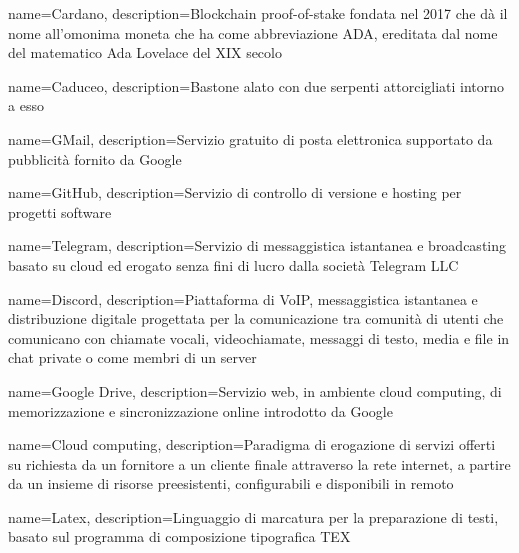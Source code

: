 {
	name={Cardano},
	description={Blockchain proof-of-stake fondata nel 2017 che dà il nome all’omonima moneta che ha come abbreviazione ADA, ereditata dal nome del matematico Ada Lovelace del XIX secolo}
}

{
	name={Caduceo},
	description={Bastone alato con due serpenti attorcigliati intorno a esso}
}

{
	name={GMail},
	description={Servizio gratuito di posta elettronica supportato da pubblicità fornito da Google}
}

{
	name={GitHub},
	description={Servizio di controllo di versione e hosting per progetti software}
}

{
	name={Telegram},
	description={Servizio di messaggistica istantanea e broadcasting basato su cloud ed erogato senza fini di lucro dalla società Telegram LLC}
}

{
	name={Discord},
	description={Piattaforma di VoIP, messaggistica istantanea e distribuzione digitale progettata per la comunicazione tra comunità di utenti che comunicano con chiamate vocali, videochiamate, messaggi di testo, media e file in chat private o come membri di un server}
}

{
	name={Google Drive},
	description={Servizio web, in ambiente cloud computing\glo, di memorizzazione e sincronizzazione online introdotto da Google}
}

{
	name={Cloud computing},
	description={Paradigma di erogazione di servizi offerti su richiesta da un fornitore a un cliente finale attraverso la rete internet, a partire da un insieme di risorse preesistenti, configurabili e disponibili in remoto}
}

{
	name={Latex},
	description={Linguaggio di marcatura per la preparazione di testi, basato sul programma di composizione tipografica TEX}
}

